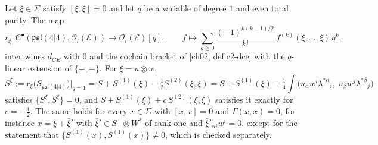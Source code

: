 \begin{lemma}
\label{lem:o-ev}
Let $\xi\in\Sigma$ satisfy $[\xi,\xi]=0$ and let $q$ be a variable of degree $1$ and even total parity. The map
\begin{equation}
r_\xi\colon C^\bullet(\mathfrak{psl}(4|4),\mathscr O_l(\mathscr E))\to\mathscr O_l(\mathscr E)[q],\qquad f\mapsto\sum_{k\ge0}\frac{(-1)^{k(k-1)/2}}{k!}\,f^{(k)}(\xi,\dots,\xi)\,q^k,
\label{eq:o-ev}
\end{equation}
intertwines $d_{CE}$ with $0$ and the cochain bracket of [ch02, def:c2-dce] with the $q$-linear extension of $\{-,-\}$. For $\xi=u\otimes w$,
\begin{equation}
S^\xi:=r_\xi\big(S_{\mathfrak{psl}(4|4)}\big)\big|_{q=1}=S+S^{(1)}(\xi)-\tfrac12S^{(2)}(\xi,\xi)=S+S^{(1)}(\xi)+\tfrac14\int\big(u_\alpha w^i\lambda^{*\alpha}{}_i,\;u_\beta w^j\lambda^{*\beta}{}_j\big)
\label{eq:o-twistaction}
\end{equation}
satisfies $\{S^\xi,S^\xi\}=0$, and $S+S^{(1)}(\xi)+c\,S^{(2)}(\xi,\xi)$ satisfies it exactly for $c=-\tfrac12$. The same holds for every $x\in\Sigma$ with $[x,x]=0$ and $\Gamma(x,x)=0$, for instance $x=\xi+\bar\xi'$ with $\bar\xi'\in S_-\otimes W^*$ of rank one and $\bar\xi'_{\dot\alpha i}w^i=0$, except for the statement that $\{S^{(1)}(x),S^{(1)}(x)\}\neq0$, which is checked separately.
\end{lemma}

